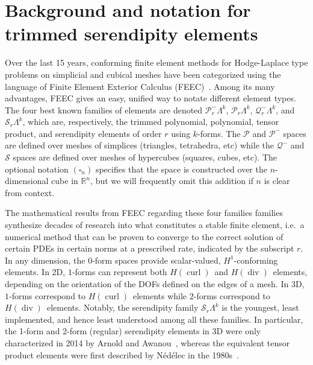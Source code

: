 \documentclass[format=acmsmall,screen,timestamp=false,a4paper]{acmart}
\DeclareMathOperator{\Div}{div}
\DeclareMathOperator{\curl}{curl}
\newcommand{\R}{\mathbb{R}}
\newcommand{\calP}{\mathcal{P}}
\newcommand{\calQ}{\mathcal{Q}}
\newcommand{\calS}{\mathcal{S}}
\newcommand{\hcurl}{\ensuremath{{H}(\curl)}\xspace}
\newcommand{\hdiv}{\ensuremath{{H}(\Div)}\xspace}
\begin{document}
  
  
\section{Background and notation for trimmed serendipity elements}
   
    Over the last 15 years, conforming finite element methods for Hodge-Laplace type problems on simplicial and cubical meshes have been categorized using the language of Finite Element Exterior Calculus (FEEC)~\cite{AFW2006,AFW2010,ABB2012}.  Among its many advantages, FEEC gives an easy, unified way to notate different element types.  The four best known families of elements are denoted $\calP^-_r \Lambda^k$, $\calP_r \Lambda^k$, $\calQ^-_r \Lambda^k$, and $\calS_r \Lambda^k$, which are, respectively, the trimmed polynomial, polynomial, tensor product, and serendipity elements of order $r$ using $k$-forms.  The $\calP$ and $\calP^-$ spaces are defined over meshes of simplices (triangles, tetrahedra, etc) while the $\calQ^-$ and $\calS$ spaces are defined over meshes of hypercubes (squares, cubes, etc). The optional notation $(\square_n)$ specifies that the space is constructed over the $n$-dimensional cube in $\R^n$, but we will frequently omit this addition if $n$ is clear from context.
    
    The mathematical results from FEEC regarding these four families families synthesize decades of research into what constitutes a stable finite element, i.e.\ a numerical method that can be proven to converge to the correct solution of certain PDEs in certain norms at a prescribed rate, indicated by the subscript $r$.  In any dimension, the $0$-form spaces provide scalar-valued, $H^1$-conforming elements.  In 2D, $1$-forms can represent both \hcurl~and \hdiv~elements, depending on the orientation of the DOFs defined on the edges of a mesh.  In 3D, $1$-forms correspond to \hcurl~elements while $2$-forms correspond to \hdiv~elements.  Notably, the serendipity family $\calS_r\Lambda^k$ is the youngest, least implemented, and hence least understood among all these families.  In particular, the 1-form and 2-form (regular) serendipity elements in 3D were only characterized in 2014 by Arnold and Awanou~\cite{arnold2014finite}, whereas the equivalent tensor product elements were first described by N\'ed\'elec in the 1980s~\cite{N1980,N1986}.
 
\end{document}
